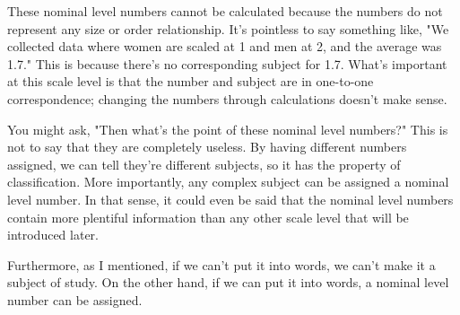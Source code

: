 \documentclass{ltjsbook}
\begin{document}
These nominal level numbers cannot be calculated because the numbers do not represent any size or order relationship. It's pointless to say something like, "We collected data where women are scaled at 1 and men at 2, and the average was 1.7." This is because there's no corresponding subject for 1.7. What's important at this scale level is that the number and subject are in one-to-one correspondence; changing the numbers through calculations doesn't make sense.

You might ask, "Then what's the point of these nominal level numbers?" This is not to say that they are completely useless. By having different numbers assigned, we can tell they're different subjects, so it has the property of classification. More importantly, any complex subject can be assigned a nominal level number. In that sense, it could even be said that the nominal level numbers contain more plentiful information than any other scale level that will be introduced later.

Furthermore, as I mentioned, if we can't put it into words, we can't make it a subject of study. On the other hand, if we can put it into words, a nominal level number can be assigned.
\end{document}
